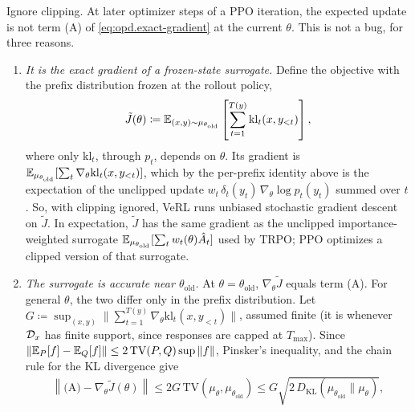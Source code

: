 \begin{remark}
    Ignore clipping. At later optimizer steps of a PPO iteration, the expected update is not
    term (A) of \eqref{eq:opd.exact-gradient} at the current $\theta$. This is not a bug, for
    three reasons.
    \begin{enumerate}
        \item \emph{It is the exact gradient of a frozen-state surrogate.} Define the objective
        with the prefix distribution frozen at the rollout policy,
        \begin{align*}
            \tilde J(\theta)
            \coloneqq
            \mathbb{E}_{(x,y)\sim\mu_{\theta_{\mathrm{old}}}}
            \left[
                \sum_{t=1}^{T(y)}\mathrm{kl}_t(x,y_{<t})
            \right],
        \end{align*}
        where only $\mathrm{kl}_t$, through $p_t$, depends on $\theta$. Its gradient is
        $\mathbb{E}_{\mu_{\theta_{\mathrm{old}}}}[\sum_t\nabla_\theta\mathrm{kl}_t(x,y_{<t})]$, which by the
        per-prefix identity above is the expectation of the unclipped update
        $w_t\,\delta_t(y_t)\,\nabla_\theta\log p_t(y_t)$ summed over $t$. So, with clipping
        ignored, VeRL runs unbiased stochastic gradient descent on $\tilde J$. In expectation,
        $\tilde J$ has the same gradient as the unclipped importance-weighted surrogate
        $\mathbb{E}_{\mu_{\theta_{\mathrm{old}}}}[\sum_t w_t(\theta)\hat A_t]$ used by TRPO; PPO optimizes a
        clipped version of that surrogate.
        \item \emph{The surrogate is accurate near $\theta_{\mathrm{old}}$.} At
        $\theta=\theta_{\mathrm{old}}$, $\nabla_\theta\tilde J$ equals term (A). For general
        $\theta$, the two differ only in the prefix distribution. Let
        $G\coloneqq\sup_{(x,y)}\|\sum_{t=1}^{T(y)}\nabla_\theta\mathrm{kl}_t(x,y_{<t})\|$, assumed
        finite (it is whenever ${\cal D}_x$ has finite support, since responses are capped at
        $T_{\max}$). Since
        $\|\mathbb{E}_P[f]-\mathbb{E}_Q[f]\|\le 2\,\mathrm{TV}(P,Q)\sup\|f\|$, Pinsker's inequality, and the
        chain rule for the KL divergence give
        \begin{align*}
            \left\|
                \text{(A)}-\nabla_\theta\tilde J(\theta)
            \right\|
            \le
            2G\,\mathrm{TV}(\mu_\theta,\mu_{\theta_{\mathrm{old}}})
            \le
            G\sqrt{2\,D_{\mathrm{KL}}(\mu_{\theta_{\mathrm{old}}}\|\mu_\theta)},
            \\

\end{align*}
\end{enumerate}
\end{remark}
